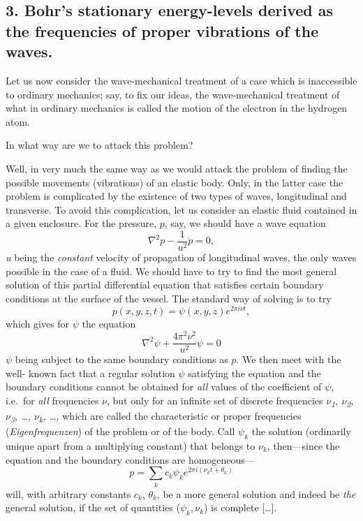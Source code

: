 \subsection{3. Bohr's stationary energy-levels derived as the frequencies of proper
vibrations of the waves.}

Let us now consider the wave‑mechanical treatment of a case which is
inaccessible to ordinary mechanics; say, to fix our ideas, the
wave‑mechanical treatment of what in ordinary mechanics is called the
motion of the electron in the hydrogen atom.

In what way are we to attack this problem?

Well, in very much the same way as we would attack the problem of
finding the possible movements (vibrations) of an elastic body. Only, in
the latter case the problem is complicated by the existence of two types
of waves, longitudinal and transverse. To avoid this complication, let
us consider an elastic fluid contained in a given enclosure. For the
pressure, $p$, say, we should have a wave equation
\begin{equation}
\nabla^2p - \frac{1}{u^2}\ddot{p} = 0 , %
\end{equation}
\emph{u} being the \emph{constant} velocity of propagation of
longi­tudinal waves, the only waves possible in the case of a fluid. We
should have to try to find the most general solution of this partial
differential equation that satisfies certain boundary
conditions at the surface of the vessel. The
standard way of solving is to try
\begin{equation*}
p(x,y,z,t) = \psi(x,y,z)e^{2\pi i\nu t} ,
\end{equation*}
which gives for $\psi$ the equation
%
\begin{equation*}\tag{10'}
\nabla^2\psi + \frac{4\pi^2\nu^2}{u^2}\psi = 0
\end{equation*}
%
$\psi$ being subject to the same boundary conditions as $p$. We
then meet with the well- known fact that a regular solution $\psi$
satisfying the equation and the boundary conditions cannot be obtained
for \emph{all} values of the co­efficient of $\psi$, i.e.\ for
\emph{all} frequencies $\nu$, but only for an infinite set of
discrete frequencies \emph{$\nu$\textsubscript{1}, $\nu$\textsubscript{2},
$\nu$\textsubscript{3}, \ldots , $\nu$\textsubscript{k}, \ldots ,} which are
called the characteristic or proper
frequencies (\emph{Eigenfrequenzen}) of the problem or of the body.
Call $\psi_k$ the solution (ordinarily unique apart
from a multiplying constant) that belongs to $\nu_k$,
then---since the equation and the boundary conditions are homogeneous---
%
\begin{equation}
p = \sum_{k}c_k \psi_k e^{2\pi i(\nu_kt+\theta_k)} %
\end{equation}
%
will, with arbitrary constants $c_k$, $\theta_k$, be a more general solution and indeed be
\emph{the} general solution, if the set of quantities
($\psi_k, \nu_k$) is complete [\ldots].

